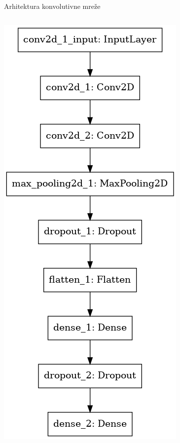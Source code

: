 \documentclass{beamer}
\begin{document}
\begin{frame}{Arhitektura konvolutivne mreže}
\begin{columns}
\begin{column}{0.25\textwidth}
\begin{center}
            \includegraphics[scale=0.21]{./slike/model01.png}
        \end{center}
    \end{column}
    \end{columns}
\end{frame}
\end{document}
